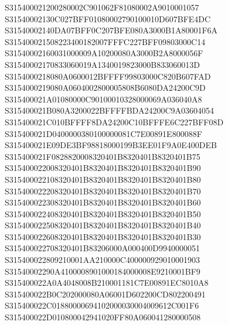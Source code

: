 \documentclass[12pt,a4paper]{article}
\begin{document}
\begin{framed}
{S315400021200280002C901062F81080002A9010001057\newline
S31540002130C027BFF01080002790100010D607BFE4DC\newline
S31540002140DA07BFF0C207BFE080A3000B1A80001F6A\newline
S315400021508223400182007FFFC227BFF09803000C14\newline
S31540002160031000009A10200080A3000B2A8000056F\newline
S31540002170833060019A1340019823000B833060013D\newline
S3154000218080A0600012BFFFF99803000C820B607FAD\newline
S3154000219080A0604002800005808B6080DA24200C9D\newline
S315400021A01080000C90100010328000069A036040A8\newline
S315400021B080A3200022BFFFFBDA24200C9A03604054\newline
S315400021C010BFFFF8DA24200C10BFFFE6C227BFF08D\newline
S315400021D0400000380100000081C7E00891E800088F\newline
S315400021E09DE3BF98818000199B3EE01F9A0E400DEB\newline
S315400021F0828820008320401B8320401B8320401B75\newline
S315400022008320401B8320401B8320401B8320401B90\newline
S315400022108320401B8320401B8320401B8320401B80\newline
S315400022208320401B8320401B8320401B8320401B70\newline
S315400022308320401B8320401B8320401B8320401B60\newline
S315400022408320401B8320401B8320401B8320401B50\newline
S315400022508320401B8320401B8320401B8320401B40\newline
S315400022608320401B8320401B8320401B8320401B30\newline
S315400022708320401B83206000A000400D9940000051\newline
S315400022809210001AA210000C400000929010001903\newline
S31540002290A4100008901000184000008E9210001BF9\newline
S315400022A0A4048008B210001181C7E00891EC8010A8\newline
S315400022B0C202000080A06001D602200CD802200491\newline
S315400022C01880000694102000030004009612C001F6\newline
S315400022D010800042941020FF80A060041280000508\newline
}
\end{framed}
\end{document}
